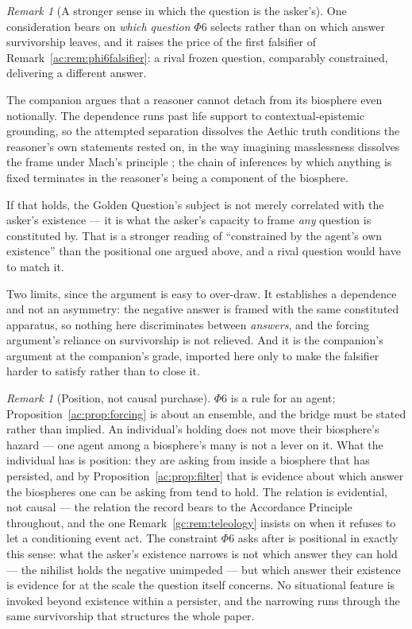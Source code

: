 \documentclass[11pt]{article}
\numberwithin{equation}{section}
\theoremstyle{plain}
\theoremstyle{definition}
\theoremstyle{remark}
\newtheorem{remark}[theorem]{Remark}
\begin{document}
\begin{remark}[A stronger sense in which the question is the asker's]
\label{ac:rem:indecomposable}
One consideration bears on \emph{which question} $\Phi6$ selects rather
than on which answer survivorship leaves, and it raises the price of the
first falsifier of Remark~\ref{ac:rem:phi6falsifier}: a rival frozen
question, comparably constrained, delivering a different answer.

The companion argues that a reasoner cannot detach from its biosphere
even notionally. The dependence runs past life support to
contextual-epistemic grounding, so the attempted separation dissolves the
Aethic truth conditions the reasoner's own statements rested on, in the
way imagining masslessness dissolves the frame under Mach's principle
\cite{Nexus, Barbour1995}; the chain of inferences by which anything is
fixed terminates in the reasoner's being a component of the biosphere.

If that holds, the Golden Question's subject is not merely correlated
with the asker's existence --- it is what the asker's capacity to frame
\emph{any} question is constituted by. That is a stronger reading of
``constrained by the agent's own existence'' than the positional one
argued above, and a rival question would have to match it.

Two limits, since the argument is easy to over-draw. It establishes a
dependence and not an asymmetry: the negative answer is framed with the
same constituted apparatus, so nothing here discriminates between
\emph{answers}, and the forcing argument's reliance on survivorship is
not relieved. And it is the companion's argument at the companion's
grade, imported here only to make the falsifier harder to satisfy rather
than to close it.
\end{remark}

\begin{remark}[Position, not causal purchase]\label{ac:rem:bridge}
$\Phi6$ is a rule for an agent; Proposition~\ref{ac:prop:forcing} is about an ensemble, and the bridge must be stated rather than implied. An individual's holding does not move their biosphere's hazard --- one agent among a biosphere's many is not a lever on it. What the individual has is position: they are asking from inside a biosphere that has persisted, and by Proposition~\ref{ac:prop:filter} that is evidence about which answer the biospheres one can be asking from tend to hold. The relation is evidential, not causal --- the relation the record bears to the Accordance Principle throughout, and the one Remark~\ref{gc:rem:teleology} insists on when it refuses to let a conditioning event act. The constraint $\Phi6$ asks after is positional in exactly this sense: what the asker's existence narrows is not which answer they can hold --- the nihilist holds the negative unimpeded --- but which answer their existence is evidence for at the scale the question itself concerns. No situational feature is invoked beyond existence within a persister, and the narrowing runs through the same survivorship that structures the whole paper.
\end{remark}
\end{document}
